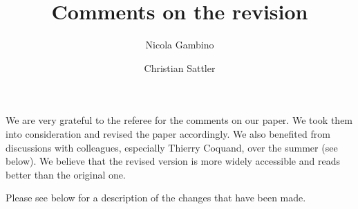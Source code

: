 \documentclass[reqno,10pt,a4paper,oneside,draft]{amsart}
\begin{document}
\title{Comments on the revision} 

\author{Nicola Gambino \and Christian Sattler} 

\maketitle

We are very grateful to the referee for the comments on our paper. We took them into consideration and revised the paper accordingly. We also benefited from
discussions with colleagues, especially Thierry Coquand, over the summer (see below). We believe that the revised version is
more widely accessible and reads better than the original one. 

Please see below for a description of the changes that have been made.
\end{document}
